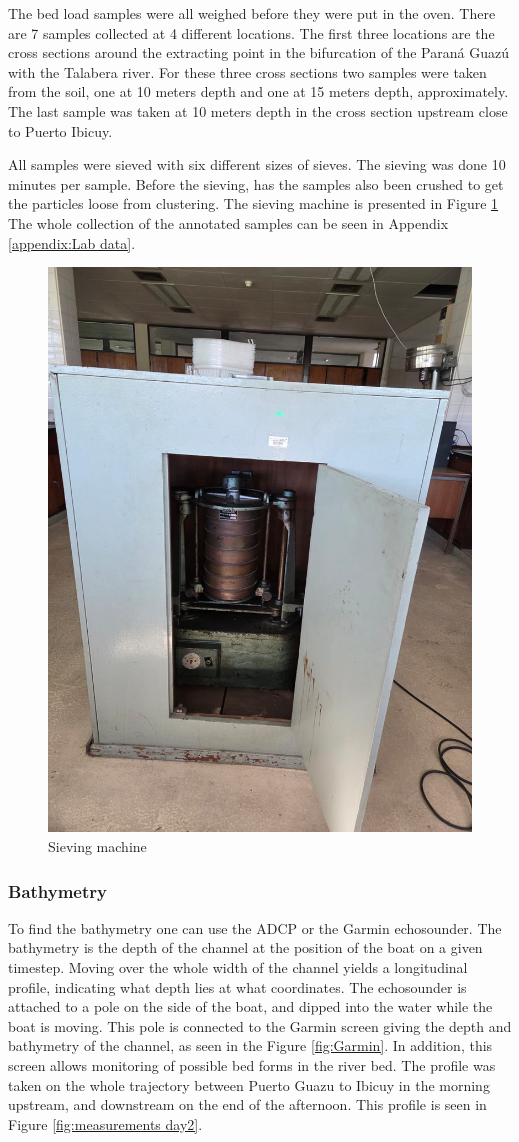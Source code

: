 The bed load samples were all weighed before they were put in the oven. There are 7 samples collected at 4 different locations. The first three locations are the cross sections around the extracting point in the bifurcation of the Paraná Guazú with the Talabera river. For these three cross sections two samples were taken from the soil, one at 10 meters depth and one at 15 meters depth, approximately. 
The last sample was taken at 10 meters depth in the cross section upstream close to Puerto Ibicuy. 

All samples were sieved with six different sizes of sieves. The sieving was done 10 minutes per sample. Before the sieving, has the samples also been crushed to get the particles loose from clustering. The sieving machine is presented in Figure \ref{fig:siev} The whole collection of the annotated samples can be seen in Appendix \ref{appendix:Lab data}.

\begin{figure}[H]
    \centering
    \includegraphics[width=0.5\linewidth]{figures//ch3/siev.png}
    \caption{Sieving machine}
    \label{fig:siev}
\end{figure}


\subsubsection{Bathymetry}
To find the bathymetry one can use the ADCP or the Garmin echosounder. 
The bathymetry is the depth of the channel at the position of the boat on a given timestep. Moving over the whole width of the channel yields a longitudinal profile, indicating what depth lies at what coordinates.
The echosounder is attached to a pole on the side of the boat, and dipped into the water while the boat is moving. This pole is connected to the Garmin screen giving the depth and bathymetry of the channel, as seen in the Figure \ref{fig:Garmin}. In addition, this screen allows monitoring of possible bed forms in the river bed. The profile was taken on the whole trajectory between Puerto Guazu to Ibicuy in the morning upstream, and downstream on the end of the afternoon. This profile is seen in Figure \ref{fig:measurements day2}.

